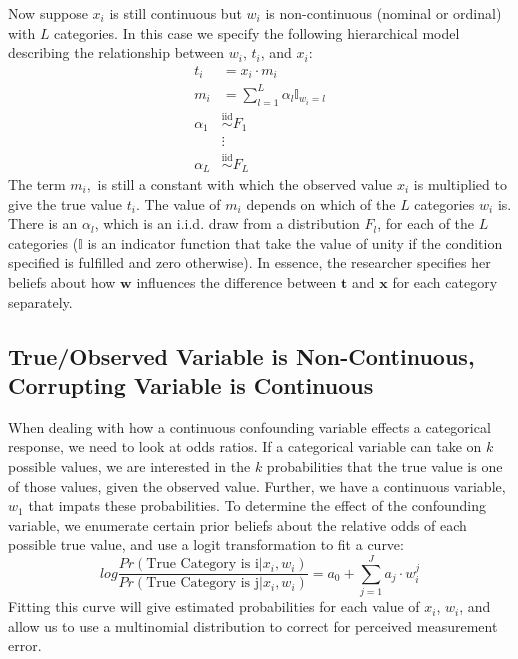 \documentclass[fignum,letterpaper,12pt]{article}
\newcommand{\iid}{\stackrel{\mathrm{iid}}{\sim}}
\begin{document}
Now suppose $x_i$ is still continuous but $w_i$ is non-continuous (nominal or ordinal) with $L$ categories. In this case we specify the following hierarchical model describing the relationship between $w_i$, $t_i$, and $x_i$:
\begin{equation}
\begin{array}{rl}
t_i & = x_i \cdot m_i \\
m_{i} & = \sum_{l=1}^{L} \alpha_l \mathbb{I}_{w_i=l} \\
\alpha_1 & \iid F_1\\
& \vdots \\
\alpha_L & \iid F_L
\end{array}
\end{equation}
The term $m_i,$ is still a constant with which the observed value $x_i$ is multiplied to give the true value $t_i$. The value of $m_i$ depends on which of the $L$ categories $w_i$ is. There is an $\alpha_l$, which is an i.i.d. draw from a distribution $F_l$, for each of the $L$ categories ($\mathbb{I}$ is an indicator function that take the value of unity if the condition specified is fulfilled and zero otherwise). In essence, the researcher specifies her beliefs about how $\mathbf{w}$ influences the difference between $\mathbf{t}$ and $\mathbf{x}$ for each category separately.


\subsection{True/Observed Variable is Non-Continuous, Corrupting Variable is Continuous} \label{subsec:case3}

When dealing with how a continuous confounding variable effects a categorical response, we need to look at odds ratios. If a categorical variable can take on $k$ possible values, we are interested in the $k$ probabilities that the true value is one of those values, given the observed value. Further, we have a continuous variable, $w_1$ that impats these probabilities. To determine the effect of the confounding variable, we enumerate certain prior beliefs about the relative odds of each possible true value, and use a logit transformation to fit a curve:
\begin{equation}
log\frac{Pr(\text{True Category is i}|x_i,w_i)}{Pr(\text{True Category is j}|x_i,w_i)}=a_0+\sum_{j=1}^J a_j \cdot w_i^j
\end{equation}
Fitting this curve will give estimated probabilities for each value of $x_i$, $w_i$, and allow us to use a multinomial distribution to correct for perceived measurement error.
\end{document}
